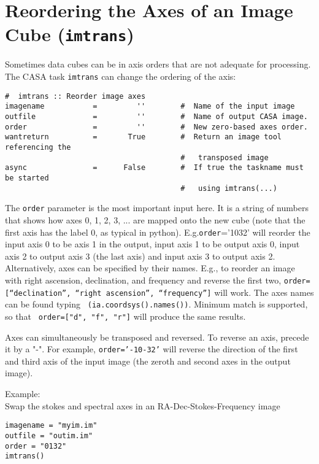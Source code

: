 \section{Reordering the Axes of an Image Cube ({\tt imtrans})}
\label{section:analysis.imtrans}

Sometimes data cubes can be in axis orders that are not adequate for
processing. The CASA task {\tt imtrans} can change the ordering of the axis:
\small
\begin{verbatim}
#  imtrans :: Reorder image axes
imagename           =         ''        #  Name of the input image
outfile             =         ''        #  Name of output CASA image.
order               =         ''        #  New zero-based axes order.
wantreturn          =       True        #  Return an image tool referencing the
                                        #   transposed image
async               =      False        #  If true the taskname must be started
                                        #   using imtrans(...)
\end{verbatim}
\normalsize


The {\tt order} parameter is the most important input here. It is a
string of numbers that shows how axes 0, 1, 2, 3, ... are mapped onto
the new cube (note that the first axis has the label 0, as typical in
python). E.g.{\tt order}='1032' will reorder the input axis 0 to be
axis 1 in the output, input axis 1 to be output axis 0, input axis 2
to output axis 3 (the last axis) and input axis 3 to output axis
2. Alternatively, axes can be specified by their names. E.g., to reorder
an image with right ascension, declination, and frequency and reverse
the first two, {\tt order=[``declination'', ``right ascension'',
  ``frequency'']} will work. The axes names can be found typing {\tt
  (ia.coordsys().names())}. Minimum match is supported, so that  {\tt
  order=["d", "f", "r"]} will produce the same results.

Axes can simultaneously be transposed and reversed. To reverse an
axis, precede it by a "-". For example, {\tt order='-10-32'} will
reverse the direction of the first and third axis of the input image
(the zeroth and second axes in the output image).

Example:\\

Swap the stokes and spectral axes in an RA-Dec-Stokes-Frequency image
\small
\begin{verbatim}
imagename = "myim.im"
outfile = "outim.im"
order = "0132"
imtrans()
\end{verbatim}

